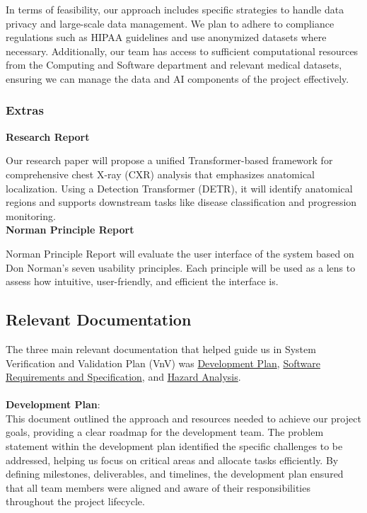 \documentclass[12pt, titlepage]{article}
\begin{document}
\noindent In terms of feasibility, our approach includes specific strategies to handle data privacy and large-scale data management. We plan to adhere to compliance regulations such as HIPAA guidelines and use anonymized datasets where necessary. Additionally, our team has access to sufficient computational resources from the Computing and Software department and relevant medical datasets, ensuring we can manage the data and AI components of the project effectively.

\subsubsection{Extras}

\noindent \textbf{Research Report}

\noindent Our research paper will propose a unified Transformer-based framework for comprehensive chest X-ray (CXR) analysis that emphasizes anatomical localization. Using a Detection Transformer (DETR), it will identify anatomical regions and supports downstream tasks like disease classification and progression monitoring. \\

\noindent \textbf{Norman Principle Report}

\noindent Norman Principle Report will evaluate the user interface of the system based on Don Norman’s seven usability principles. Each principle will be used as a lens to assess how intuitive, user-friendly, and efficient the interface is.\\

\subsection{Relevant Documentation}

The three main relevant documentation that helped guide us in System Verification and Validation Plan (VnV) was \href{https://github.com/RezaJodeiri/CXR-Capstone/blob/main/docs/DevelopmentPlan/DevelopmentPlan.pdf}{Development Plan}, \href{https://github.com/RezaJodeiri/CXR-Capstone/blob/main/docs/SRS/SRS.pdf}{Software Requirements and Specification}, and 
\href{https://github.com/RezaJodeiri/CXR-Capstone/blob/main/docs/HazardAnalysis/HazardAnalysis.pdf}{Hazard Analysis}.
\\\\
\textbf{Development Plan}:\\

\noindent This document outlined the approach and resources needed to achieve our project goals, providing a clear roadmap for the development team. The problem statement within the development plan identified the specific challenges to be addressed, helping us focus on critical areas and allocate tasks efficiently. By defining milestones, deliverables, and timelines, the development plan ensured that all team members were aligned and aware of their responsibilities throughout the project lifecycle.\\
\end{document}
